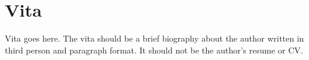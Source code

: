 \chapter*{Vita} \label{ch:vita}
Vita goes here. The vita should be a brief biography about the author written in third person and paragraph format. It should not be the author's resume or CV.